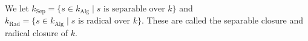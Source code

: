 We let $k_{\text{Sep}} = \{s \in k_{\text{Alg}} \mid s \text{ is separable over } k\}$ and $k_{\text{Rad}} = \{s \in k_{\text{Alg}} \mid s \text{ is radical over } k\}$. These are called the separable closure and radical closure of $k$.
